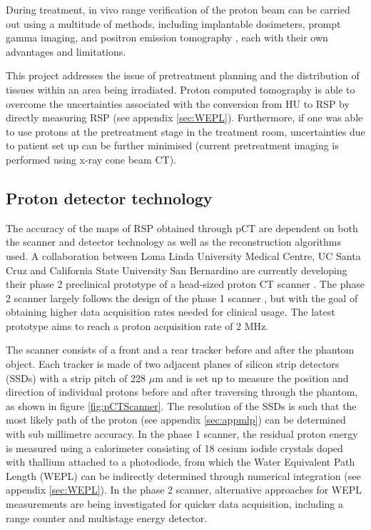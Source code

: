 \documentclass[11pt,a4paper]{article}
\begin{document}
During treatment, in vivo range verification of the proton beam can be carried out using a multitude of methods, including implantable dosimeters, prompt gamma imaging, and positron emission tomography \cite{knopf2013vivo}, each with their own advantages and limitations. 

This project addresses the issue of pretreatment planning and the distribution of tissues within an area being irradiated. Proton computed tomography is able to overcome the uncertainties associated with the conversion from HU to RSP by directly measuring RSP (see appendix \ref{sec:WEPL}). Furthermore, if one was able to use protons at the pretreatment stage in the treatment room, uncertainties due to patient set up can be further minimised (current pretreatment imaging is performed using x-ray cone beam CT).

\subsection{Proton detector technology}
\label{sec:detector}
The accuracy of the maps of RSP obtained through pCT are dependent on both the scanner and detector technology as well as the reconstruction algorithms used. A collaboration between Loma Linda University Medical Centre, UC Santa Cruz and California State University San Bernardino are currently developing their phase 2 preclinical prototype of a head-sized proton CT scanner \cite{schulte2012overview, bashkirov2016development}. The phase 2 scanner largely follows the design of the phase 1 scanner \cite{hurley2012phase}, but with the goal of obtaining higher data acquisition rates needed for clinical usage. The latest prototype aims to reach a proton acquisition rate of 2 MHz.

The scanner consists of a front and a rear tracker before and after the phantom object. Each tracker is made of two adjacent planes of silicon strip detectors (SSDs) with a strip pitch of 228 $\mu$m and is set up to measure the position and direction of individual protons before and after traversing through the phantom, as shown in figure \ref{fig:pCTScanner}. The resolution of the SSDs is such that the most likely path of the proton (see appendix \ref{sec:appmlp}) can be determined with sub millimetre accuracy. In the phase 1 scanner, the residual proton energy is measured using a calorimeter consisting of 18 cesium iodide crystals doped with thallium attached to a photodiode, from which the Water Equivalent Path Length (WEPL) can be indirectly determined through numerical integration (see appendix \ref{sec:WEPL}). In the phase 2 scanner, alternative approaches for WEPL measurements are being investigated for quicker data acquisition, including a range counter and multistage energy detector.
\end{document}
